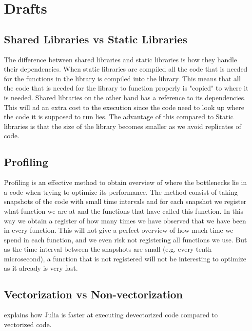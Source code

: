 \chapter{Drafts}
\section{Shared Libraries vs Static Libraries}
The difference between shared libraries and static libraries is how they handle their dependencies. When static libraries are compiled all the code that is needed for the functions in the library is compiled into the library. This means that all the code that is needed for the library to function properly is "copied" to where it is needed. Shared libraries on the other hand has a reference to its dependencies. This will ad an extra cost to the execution since the code need to look up where the code it is supposed to run lies. The advantage of this compared to Static libraries is that the size of the library becomes smaller as we avoid replicates of code.

\section{Profiling}
Profiling is an effective method to obtain overview of where the bottlenecks lie in a code when trying to optimize its performance. The method consist of taking snapshots of the code with small time intervals and for each snapshot we register what function we are at and the functions that have called this function. In this way we obtain a register of how many times we have observed that we have been in every function. This will not give a perfect overview of how much time we spend in each function, and we even risk not registering all functions we use. But as the time interval between the snapshots are small (e.g. every tenth microsecond), a function that is not registered will not be interesting to optimize as it already is very fast. 

\section{Vectorization vs Non-vectorization}
\emph{\citep{Vectorization}} explains how Julia is faster at executing devectorized code compared to vectorized code.